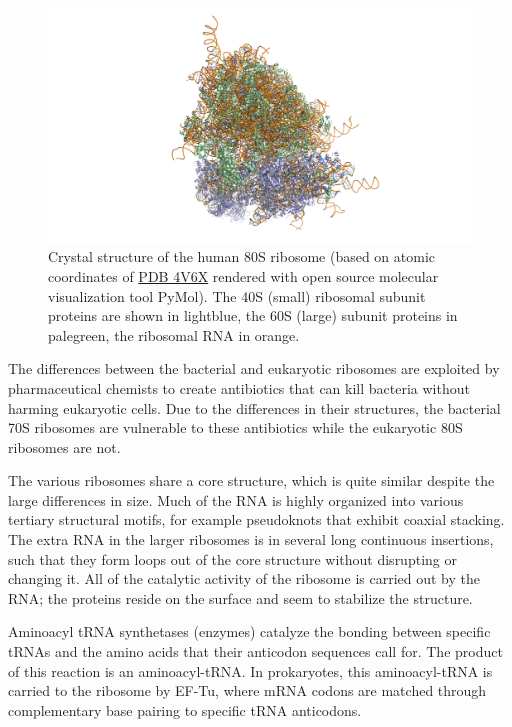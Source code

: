 \begin{figure}

{\centering \includegraphics[width=0.7\linewidth]{./figures/translation/human_ribosome} 

}

\caption{Crystal structure of the human 80S ribosome (based on atomic coordinates of \href{https://www.rcsb.org/structure/4v6x}{PDB 4V6X} rendered with open source molecular visualization tool PyMol). The 40S (small) ribosomal subunit proteins are shown in lightblue, the 60S (large) subunit proteins in palegreen, the ribosomal RNA in orange.}\label{fig:ribosome}
\end{figure}

The differences between the bacterial and eukaryotic ribosomes are exploited by pharmaceutical chemists to create antibiotics that can kill bacteria without harming eukaryotic cells. Due to the differences in their structures, the bacterial 70S ribosomes are vulnerable to these antibiotics while the eukaryotic 80S ribosomes are not.

The various ribosomes share a core structure, which is quite similar despite the large differences in size. Much of the RNA is highly organized into various tertiary structural motifs, for example pseudoknots that exhibit coaxial stacking. The extra RNA in the larger ribosomes is in several long continuous insertions, such that they form loops out of the core structure without disrupting or changing it. All of the catalytic activity of the ribosome is carried out by the RNA; the proteins reside on the surface and seem to stabilize the structure.

Aminoacyl tRNA synthetases (enzymes) catalyze the bonding between specific tRNAs and the amino acids that their anticodon sequences call for. The product of this reaction is an aminoacyl-tRNA. In prokaryotes, this aminoacyl-tRNA is carried to the ribosome by EF-Tu, where mRNA codons are matched through complementary base pairing to specific tRNA anticodons.

